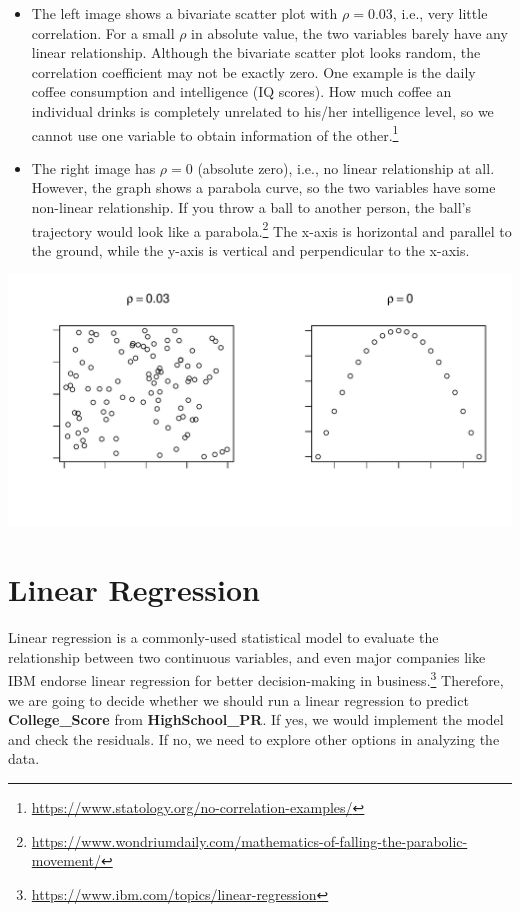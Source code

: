 \documentclass[
]{article}
\begin{document}
\begin{itemize}
\item
  The left image shows a bivariate scatter plot with \(\rho = 0.03\),
  i.e., very little correlation. For a small \(\rho\) in absolute value,
  the two variables barely have any linear relationship. Although the
  bivariate scatter plot looks random, the correlation coefficient may
  not be exactly zero. One example is the daily coffee consumption and
  intelligence (IQ scores). How much coffee an individual drinks is
  completely unrelated to his/her intelligence level, so we cannot use
  one variable to obtain information of the other.\footnote{\url{https://www.statology.org/no-correlation-examples/}}
\item
  The right image has \(\rho = 0\) (absolute zero), i.e., no linear
  relationship at all. However, the graph shows a parabola curve, so the
  two variables have some non-linear relationship. If you throw a ball
  to another person, the ball's trajectory would look like a
  parabola.\footnote{\url{https://www.wondriumdaily.com/mathematics-of-falling-the-parabolic-movement/}}
  The x-axis is horizontal and parallel to the ground, while the y-axis
  is vertical and perpendicular to the x-axis.
\end{itemize}

\includegraphics{PTT_Analysis_of_Test_Scores_Unfinished_files/figure-latex/low-correlation-1.pdf}

\hypertarget{linear-reg}{%
\section{Linear Regression}\label{linear-reg}}

Linear regression is a commonly-used statistical model to evaluate the
relationship between two continuous variables, and even major companies
like IBM endorse linear regression for better decision-making in
business.\footnote{\url{https://www.ibm.com/topics/linear-regression}}
Therefore, we are going to decide whether we should run a linear
regression to predict \textbf{College\_Score} from
\textbf{HighSchool\_PR}. If yes, we would implement the model and check
the residuals. If no, we need to explore other options in analyzing the
data.
\end{document}
